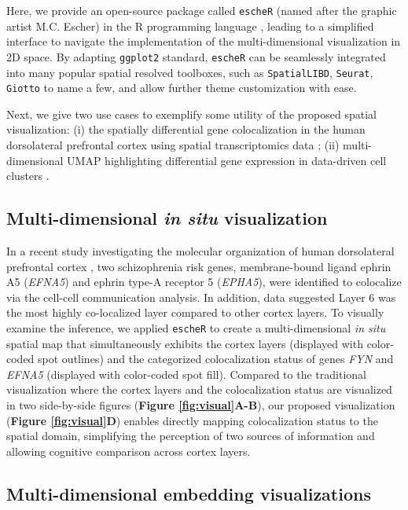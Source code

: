 \documentclass[10pt,twocolumn]{article}
\begin{document}
Here, we provide an open-source package called \texttt{escheR} (named after the graphic artist M.C. Escher) in the R programming language \cite{R}, leading to a simplified interface to navigate the implementation of the multi-dimensional visualization in 2D space. By adapting \texttt{ggplot2} standard, \texttt{escheR} can be seamlessly integrated into many popular spatial resolved toolboxes, such as \texttt{SpatialLIBD}\cite{pardo_2022}, \texttt{Seurat}\cite{hao_2021}, \texttt{Giotto}\cite{dries_2021} to name a few, and allow further theme customization with ease.

Next, we give two use cases to exemplify some utility of the proposed spatial visualization: (i) the spatially differential gene colocalization in the human dorsolateral prefrontal cortex using spatial transcriptomics data \cite{huukimyers_2023}; (ii) multi-dimensional UMAP highlighting differential gene expression in data-driven cell clusters \cite{freytag_2020}. 



\subsection{Multi-dimensional \textit{in situ} visualization}
In a recent study investigating the molecular organization of human dorsolateral prefrontal cortex \cite{huukimyers_2023}, two schizophrenia risk genes, membrane-bound ligand ephrin A5 (\textit{EFNA5}) and ephrin type-A receptor 5 (\textit{EPHA5}), were identified to colocalize via the cell-cell communication analysis. In addition, data suggested Layer 6 was the most highly co-localized layer compared to other cortex layers. To visually examine the inference, we applied \texttt{escheR} to create a multi-dimensional \textit{in situ} spatial map that simultaneously exhibits the cortex layers (displayed with color-coded spot outlines) and the categorized colocalization status of genes \textit{FYN} and \textit{EFNA5} (displayed with color-coded spot fill). Compared to the traditional visualization where the cortex layers and the colocalization status are visualized in two side-by-side figures (\textbf{Figure \ref{fig:visual}A-B}), our proposed visualization (\textbf{Figure \ref{fig:visual}D}) enables directly mapping colocalization status to the spatial domain, simplifying the perception of two sources of information and allowing cognitive comparison across cortex layers. 

\subsection{Multi-dimensional embedding visualizations}
\end{document}
